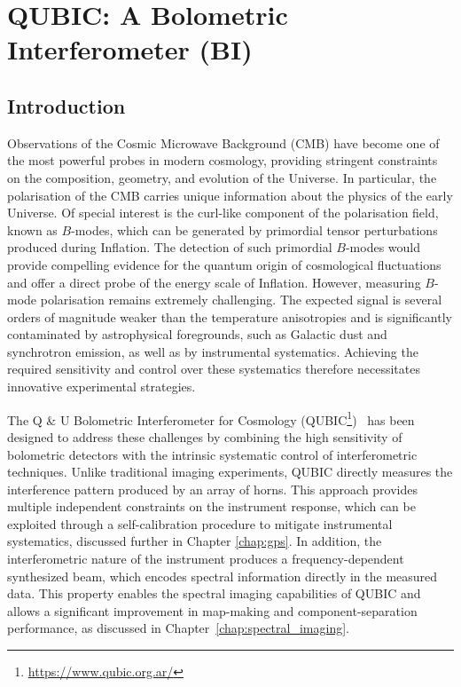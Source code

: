 \documentclass[../../thesis.tex]{subfiles}
\begin{document}
\chapter[QUBIC: A Bolometric Interferometer]{QUBIC: A Bolometric Interferometer (BI)} \label{chap:BI}
\ifSubfilesClassLoaded{
    \tableofcontents
}{
    \minitoc
}

\section*{Introduction}

Observations of the Cosmic Microwave Background (CMB) have become one of the most powerful probes in modern cosmology, providing stringent constraints on the composition, geometry, and evolution of the Universe. In particular, the polarisation of the CMB carries unique information about the physics of the early Universe. Of special interest is the curl-like component of the polarisation field, known as $B$-modes, which can be generated by primordial tensor perturbations produced during Inflation. The detection of such primordial $B$-modes would provide compelling evidence for the quantum origin of cosmological fluctuations and offer a direct probe of the energy scale of Inflation.
However, measuring $B$-mode polarisation remains extremely challenging. The expected signal is several orders of magnitude weaker than the temperature anisotropies and is significantly contaminated by astrophysical foregrounds, such as Galactic dust and synchrotron emission, as well as by instrumental systematics. Achieving the required sensitivity and control over these systematics therefore necessitates innovative experimental strategies.

The Q \& U Bolometric Interferometer for Cosmology (QUBIC\footnote{\url{https://www.qubic.org.ar/}})~\cite{QUBICI} has been designed to address these challenges by combining the high sensitivity of bolometric detectors with the intrinsic systematic control of interferometric techniques. Unlike traditional imaging experiments, QUBIC directly measures the interference pattern produced by an array of horns. This approach provides multiple independent constraints on the instrument response, which can be exploited through a self-calibration procedure to mitigate instrumental systematics, discussed further in Chapter \ref{chap:gps}. In addition, the interferometric nature of the instrument produces a frequency-dependent synthesized beam, which encodes spectral information directly in the measured data. This property enables the spectral imaging capabilities of QUBIC and allows a significant improvement in map-making and component-separation performance, as discussed in Chapter~\ref{chap:spectral_imaging}.
\end{document}
